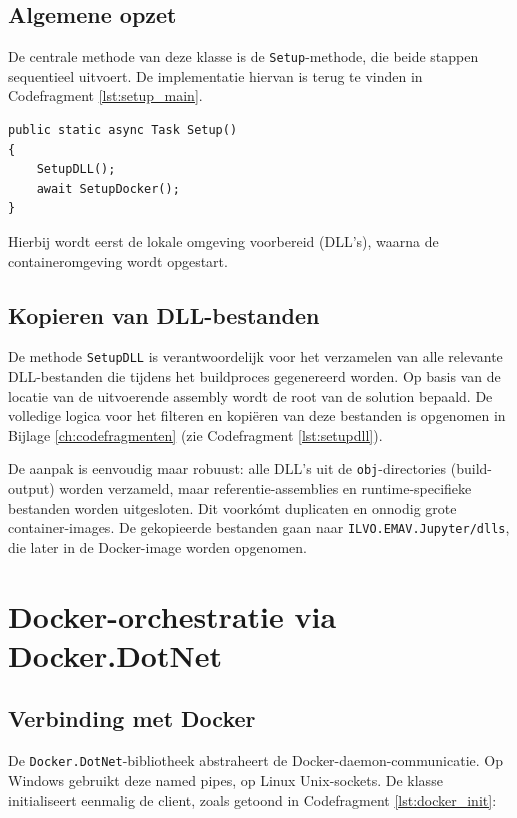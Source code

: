 \subsection{Algemene opzet}
De centrale methode van deze klasse is de \texttt{Setup}-methode, die beide stappen sequentieel uitvoert. De implementatie hiervan is terug te vinden in Codefragment \ref{lst:setup_main}.

\begin{listing}[ht]
\begin{verbatim}
public static async Task Setup()
{
    SetupDLL();
    await SetupDocker();
}
\end{verbatim}
\caption{De centrale \texttt{Setup}-methode van de \texttt{JupyterSetup}-klasse.}
\label{lst:setup_main}
\end{listing}

Hierbij wordt eerst de lokale omgeving voorbereid (DLL's), waarna de containeromgeving wordt opgestart.

\subsection{Kopieren van DLL-bestanden}
De methode \texttt{SetupDLL} is verantwoordelijk voor het verzamelen van alle relevante DLL-bestanden die tijdens het buildproces gegenereerd worden.
Op basis van de locatie van de uitvoerende assembly wordt de root van de solution bepaald. De volledige logica voor het filteren en kopiëren van deze bestanden is opgenomen in Bijlage \ref{ch:codefragmenten} (zie Codefragment \ref{lst:setupdll}).

De aanpak is eenvoudig maar robuust: alle DLL's uit de \texttt{obj}-directories 
(build-output) worden verzameld,
maar referentie-assemblies en runtime-specifieke bestanden worden uitgesloten.
Dit voorkómt duplicaten en onnodig grote container-images. 
De gekopieerde bestanden gaan naar \texttt{ILVO.EMAV.Jupyter/dlls},
die later in de Docker-image worden opgenomen.

\section{Docker-orchestratie via Docker.DotNet}

\subsection{Verbinding met Docker}

De \texttt{Docker.DotNet}-bibliotheek abstraheert de Docker-daemon-communicatie. 
Op Windows gebruikt deze named pipes,
op Linux Unix-sockets. De klasse initialiseert eenmalig de client, zoals getoond in Codefragment \ref{lst:docker_init}:

